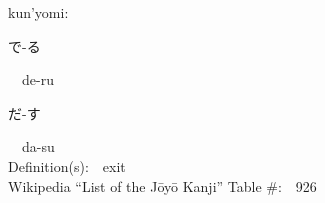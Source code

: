 \begin{multicols}{2}
{\hspace*{1em}}kun'yomi:\ \ \\
{\hspace*{2em}}{\begin{CJK}{UTF8}{min} で-る \end{CJK}}\ \ de-ru\ \ \\
{\hspace*{2em}}{\begin{CJK}{UTF8}{min} だ-す \end{CJK}}\ \ da-su\ \ \\
Definition(s):\ \ exit \\
Wikipedia ``List of the J\=oy\=o Kanji'' Table \#:\ \ 926 \\
\ \ \\
\end{multicols}



